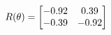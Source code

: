 \documentclass[preview]{standalone}
\begin{document}
\begin{align*}
\special{dvisvgm:raw <g id='unique000'>}R(\theta) = \begin{bmatrix}-0.92 & 0.39\\-0.39 & -0.92\end{bmatrix}\special{dvisvgm:raw </g>}
\end{align*}
\end{document}
